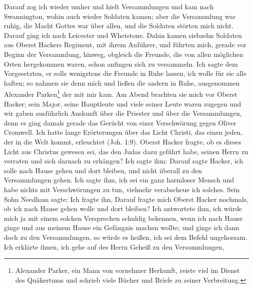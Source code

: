 Darauf zog ich wieder umher und hielt Versammlungen und
kam nach Swannington, wohin auch wieder Soldaten kamen;
aber die Versammlung war ruhig, die Macht Gottes war
über allen, und die Soldaten störten mich nicht. Darauf ging
ich nach Leicester und Whetstone. Dahin kamen siebzehn Soldaten
aus Oberst Hackers Regiment, mit ihrem Anführer, und führten
mich, gerade vor Beginn der Versammlung, hinweg, obgleich die
Freunde, die von allen möglichen Orten hergekommen waren,
schon anfingen sich zu versammeln. Ich sagte dem Vorgesetzten,
er solle wenigstens die Freunde in Ruhe lassen, ich wolle für sie
alle haften; so nahmen sie denn mich und ließen die andern in
Ruhe, ausgenommen Alexander 
Parken\footnote{Alexander Parker, 
ein Mann von vornehmer Herkunft, reiste viel im
Dienst des Quäkertums und schrieb viele Bücher und Briefe 
zu seiner Verbreitung.} der mit mir kam. Am
Abend brachten sie mich vor Oberst Hacker; sein Major, seine
Hauptleute und viele seiner Leute waren zugegen und wir gaben
ausführlich Auskunft über die Priester und über die Versammlungen,
denn es ging damals gerade das Gerücht von einer Verschwörung
gegen Oliver Cromwell. Ich hatte lange Erörterungen über das
Licht Christi, das einen jeden, der in die Welt kommt, erleuchtet
(Joh. 1:9). Oberst Hacker fragte, 
ob es dieses Licht aus Christus
gewesen sei, das den Judas dazu geführt habe, seinen Herrn zu
verraten und sich darnach zu erhängen? Ich sagte ihm:  Darauf sagte Hacker, ich solle nach Hause gehen und dort
bleiben, und nicht überall zu den Versammlungen gehen. Ich sagte
ihm, ich sei ein ganz harmloser Mensch und habe nichts mit 
Verschwörungen zu tun, vielmehr verabscheue ich solches. Sein Sohn
Needham sagte:  Ich fragte
ihn,  Darauf fragte mich Oberst Hacker nochmals, ob ich
nach Hause gehen wolle und dort bleiben? Ich antwortete ihm,
ich würde mich ja mit einem solchen Versprechen schuldig bekennen,
wenn ich nach Hause ginge und aus meinem Hause ein Gefängnis
machen wollte; und ginge ich dann doch zu den Versammlungen, so
würde es heißen, ich sei dem Befehl ungehorsam. Ich erklärte
ihnen, ich gehe auf des Herrn Geheiß zu den Versammlungen,
